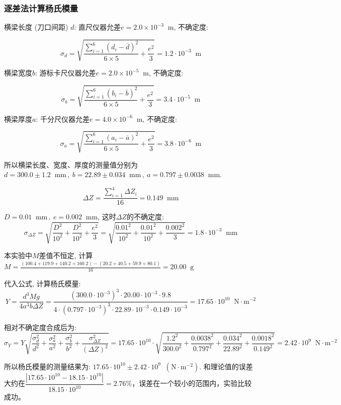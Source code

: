 \documentclass[11pt]{article}
\newcommand*{\unit}[1]{\mathop{}\!\mathrm{#1}}
\begin{document}
\subsubsection{逐差法计算杨氏模量}

横梁长度 (刀口间距) $d$: 直尺仪器允差$e = 2.0\times 10^{-3}\unit{m}$, 不确定度:

\[
    \sigma_d = \sqrt{\frac{\sum_{i=1}^{6} (d_i-\overline{d})^2}{6\times 5} + \frac{e^2}{3}} = 1.2 \cdot 10^{-3} \unit{m}
\]

横梁宽度$b$: 游标卡尺仪器允差$e = 2.0\times 10^{-5}\unit{m}$, 不确定度:

\[
    \sigma_b = \sqrt{\frac{\sum_{i=1}^{6} (b_i-\overline{b})^2}{6\times 5} + \frac{e^2}{3}} = 3.4 \cdot 10^{-5} \unit{m}
\]

横梁厚度$a$: 千分尺仪器允差$e = 4.0\times 10^{-6}\unit{m}$, 不确定度:

\[
    \sigma_a = \sqrt{\frac{\sum_{i=1}^{6} (a_i-\overline{a})^2}{6\times 5} + \frac{e^2}{3}} = 3.8 \cdot 10^{-6}  \unit{m}
\]

所以横梁长度、宽度、厚度的测量值分别为$d = 300.0 \pm 1.2 \unit{mm}\,,\ b = 22.89 \pm 0.034 \unit{mm}\,,\ a = 0.797 \pm 0.0038\unit{mm}$.

\[
    \Delta Z = \frac{\sum_{i=1}^4 \Delta Z_i}{16} = 0.149 \unit{mm}
\]

$D=0.01\unit{mm}\,,\ e = 0.002\unit{mm}$, 这时$\Delta Z$的不确定度: 
\[
    \sigma_{\Delta Z} = \sqrt{\frac{D^2}{10^2} + \frac{D^2}{10^2} + \frac{e^2}{3}} = \sqrt{\frac{0.01^2}{10^2} + \frac{0.01^2}{10^2} + \frac{0.002^2}{3}} = 1.8 \cdot 10^{-3} \unit{mm}
\]

本实验中$M$差值不恒定, 计算$M = \frac{(100.4+119.9+140.2+160.2) - (20.2+40.5+59.9+80.1)}{16} = 20.00 \unit{g}$

代入公式, 计算杨氏模量:
\[
    Y = \frac{d^{3}Mg}{4a^{3}b\Delta Z} = \frac{(300.0 \cdot 10^{-3})^{3} \cdot 20.00 \cdot 10^{-3} \cdot 9.8}{4 \cdot (0.797 \cdot 10^{-3})^{3} \cdot 22.89 \cdot 10^{-3} \cdot 0.149 \cdot 10^{-3}} = 17.65 \cdot 10^{10}  \unit{N \cdot m^{-2}}
\]

相对不确定度合成后为:
\[
    \sigma_Y = Y\sqrt{\frac{\sigma_d^2}{d^2} + \frac{\sigma_a^2}{a^2} + \frac{\sigma_b^2}{b^2} + \frac{\sigma_{\Delta Z}^2}{(\Delta Z)^2}} = 17.65 \cdot 10^{10} \cdot \sqrt{\frac{1.2^2}{300.0^2} + \frac{0.0038^2}{0.797^2} + \frac{0.034^2}{22.89^2} + \frac{0.0018^2}{0.149^2}} = 2.42 \cdot 10^{9} \unit{N \cdot m^{-2}}
\]

所以杨氏模量的测量结果为: $17.65 \cdot 10^{10}  \pm 2.42 \cdot 10^{9} \unit{(N \cdot m^{-2})}$. 和理论值的误差大约在$\dfrac{|17.65 \cdot 10^{10} - 18.15\cdot 10^{10}|}{18.15\cdot 10^{10}} = 2.76 \%$，误差在一个较小的范围内，实验比较成功。
\end{document}
